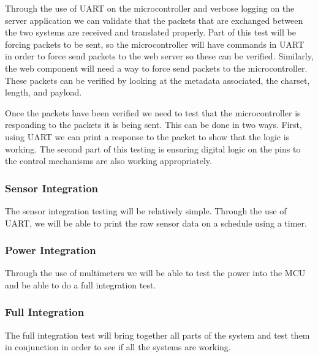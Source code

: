 Through the use of UART on the microcontroller and verbose logging on the server application we can validate that the packets that are exchanged between the two systems are received and translated properly. Part of this test will be forcing packets to be sent, so the microcontroller will have commands in UART in order to force send packets to the web server so these can be verified. Similarly, the web component will need a way to force send packets to the microcontroller. These packets can be verified by looking at the metadata associated, the charset, length, and payload.

Once the packets have been verified we need to test that the microcontroller is responding to the packets it is being sent. This can be done in two ways. First, using UART we can print a response to the packet to show that the logic is working. The second part of this testing is ensuring digital logic on the pins to the control mechanisms are also working appropriately.

\subsubsection{Sensor Integration}
The sensor integration testing will be relatively simple. Through the use of UART, we will be able to print the raw sensor data on a schedule using a timer.

\subsubsection{Power Integration}
Through the use of multimeters we will be able to test the power into the MCU and be able to do a full integration test.

\subsubsection{Full Integration}
The full integration test will bring together all parts of the system and test them in conjunction in order to see if all the systems are working. 